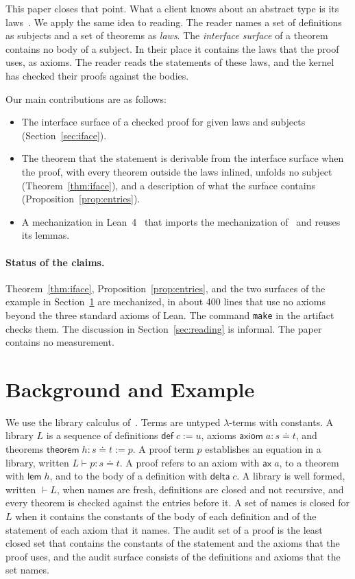 \documentclass[acmsmall,nonacm,screen]{acmart}
\newcommand{\eqd}{\doteq}
\newcommand{\kw}[1]{\mathsf{#1}}
\newcommand{\chk}[4]{#1 \vdash #2 : #3 \eqd #4}
\newcommand{\wf}[1]{\vdash #1}
\newcommand{\lean}[1]{\texttt{#1}}
\begin{document}
This paper closes that point. What a client knows about an abstract type is its
laws~\citep{mitchell1988}. We apply the same idea to reading. The reader names a set of
definitions as subjects and a set of theorems as \emph{laws}. The \emph{interface surface} of a
theorem contains no body of a subject. In their place it contains the laws that the proof uses,
as axioms. The reader reads the statements of these laws, and the kernel has checked their
proofs against the bodies.

Our main contributions are as follows:
\begin{itemize}
\item The interface surface of a checked proof for given laws and subjects
  (Section~\ref{sec:iface}).
\item The theorem that the statement is derivable from the interface surface when the proof,
  with every theorem outside the laws inlined, unfolds no subject (Theorem~\ref{thm:iface}), and
  a description of what the surface contains (Proposition~\ref{prop:entries}).
\item A mechanization in Lean~4~\citep{moura2021} that imports the mechanization
  of~\citet{tpp1} and reuses its lemmas.
\end{itemize}

\paragraph{Status of the claims.}
Theorem~\ref{thm:iface}, Proposition~\ref{prop:entries}, and the two surfaces of the example in
Section~\ref{sec:example} are mechanized, in about 400 lines that use no axioms beyond the three
standard axioms of Lean. The command \lean{make} in the artifact checks them. The discussion in
Section~\ref{sec:reading} is informal. The paper contains no measurement.

\section{Background and Example}
\label{sec:example}

We use the library calculus of~\citet{tpp1}. Terms are untyped $\lambda$-terms with constants. A
library $L$ is a sequence of definitions $\kw{def}\;c := u$, axioms
$\kw{axiom}\;a : s \eqd t$, and theorems $\kw{theorem}\;h : s \eqd t := p$. A proof term $p$
establishes an equation in a library, written $\chk{L}{p}{s}{t}$. A proof refers to an axiom
with $\kw{ax}\;a$, to a theorem with $\kw{lem}\;h$, and to the body of a definition with
$\kw{delta}\;c$. A library is well formed, written $\wf{L}$, when names are fresh, definitions
are closed and not recursive, and every theorem is checked against the entries before it. A set
of names is closed for $L$ when it contains the constants of the body of each definition and of
the statement of each axiom that it names. The audit set of a proof is the least closed set that
contains the constants of the statement and the axioms that the proof uses, and the audit surface
consists of the definitions and axioms that the set names.
\end{document}
